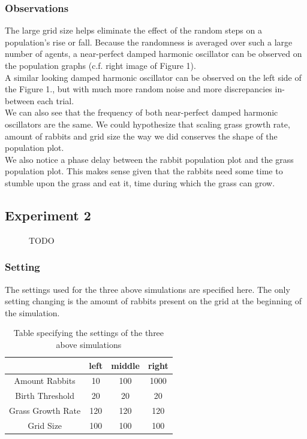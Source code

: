 \documentclass[11pt]{article}
\begin{document}
\subsubsection{Observations}
The large grid size helps eliminate the effect of the random steps on a population's rise or fall. Because the randomness is averaged over such a large number of agents, a near-perfect damped harmonic oscillator can be observed on the population graphs (c.f. right image of Figure 1).\\

A similar looking damped harmonic oscillator can be observed on the left side of the Figure 1., but with much more random noise and more discrepancies in-between each trial.\\

We can also see that the frequency of both near-perfect damped harmonic oscillators are the same. We could hypothesize that scaling grass growth rate, amount of rabbits and grid size the way we did conserves the shape of the population plot.\\

We also notice a phase delay between the rabbit population plot and the grass population plot. This makes sense given that the rabbits need some time to stumble upon the grass and eat it, time during which the grass can grow.\\
\subsection{Experiment 2}
\begin{figure}[h]
	\centering
	\caption{TODO}
	\label{figure:2}
\end{figure}
\subsubsection{Setting}

The settings used for the three above simulations are specified here. The only setting changing is the amount of rabbits present on the grid at the beginning of the simulation.\\

\begin{table}[h]
	\centering
	\begin{tabular}{ | c | c | c | c | } 
		\hline
		\qquad & left & middle & right \\
		\hline
		Amount Rabbits & 10 & 100 & 1000\\ 
		\hline
		Birth Threshold & 20 & 20 & 20 \\
		\hline
		Grass Growth Rate & 120 & 120 & 120 \\
		\hline
		Grid Size & 100 & 100 & 100\\  
		\hline
	\end{tabular}
	\caption{Table specifying the settings of the three above simulations}
	\label{table:2}
\end{table}
\end{document}
